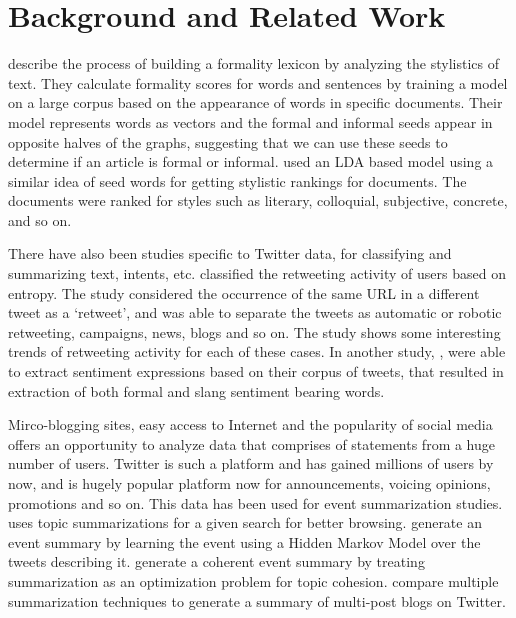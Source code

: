 \section{Background and Related Work}

 describe the process of building a formality lexicon by analyzing the stylistics of text. They calculate formality scores for words and sentences by training a model on a large corpus based on the appearance of words in specific documents. Their model represents words as vectors and the formal and informal seeds appear in opposite halves of the graphs, suggesting that we can use these seeds to determine if an article is formal or informal.  used an LDA based model using a similar idea of seed words for getting stylistic rankings for documents. The documents were ranked for styles such as literary, colloquial, subjective, concrete, and so on. 

There have also been studies specific to Twitter data, for classifying and summarizing text, intents, etc.  classified the retweeting activity of users based on entropy. The study considered the occurrence of the same URL in a different tweet as a ‘retweet’, and was able to separate the tweets as automatic or robotic retweeting, campaigns, news, blogs and so on. The study shows some interesting trends of retweeting activity for each of these cases. In another study, , were able to extract sentiment expressions based on their corpus of tweets, that resulted in extraction of both formal and slang sentiment bearing words.

Mirco-blogging sites, easy access to Internet and the popularity of social media offers an opportunity to analyze data that comprises of statements from a huge number of users. Twitter is such a platform and has gained millions of users by now, and is hugely popular platform now for announcements, voicing opinions, promotions and so on. This data has been used for event summarization studies.  uses topic summarizations for a given search for better browsing.  generate an event summary by learning the event using a Hidden Markov Model over the tweets describing it.  generate a coherent event summary by treating summarization as an optimization problem for topic cohesion.  compare multiple summarization techniques to generate a summary of multi-post blogs on Twitter.

